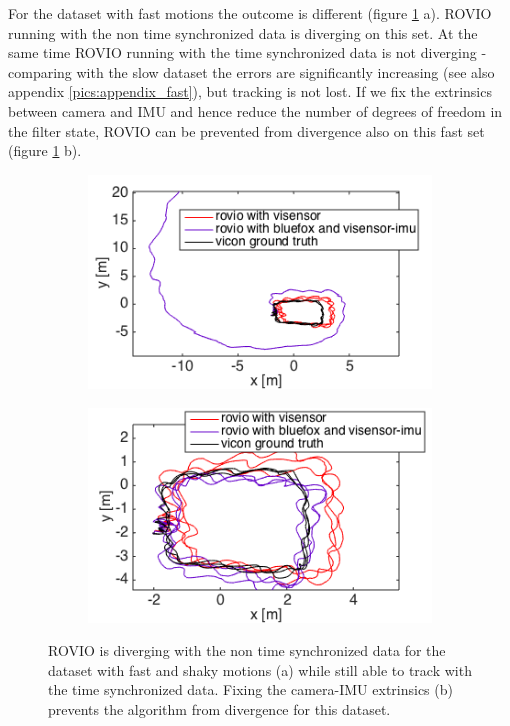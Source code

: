 For the dataset with fast motions the outcome is different (figure \ref{pics:timesync_fast} a). ROVIO running with the non time synchronized data is diverging on this set. At the same time ROVIO running with the time synchronized data is not diverging - comparing with the slow dataset the errors are significantly increasing (see also appendix \ref{pics:appendix_fast}), but tracking is not lost. If we fix the extrinsics between camera and IMU and hence reduce the number of degrees of freedom in the filter state, ROVIO can be prevented from divergence also on this fast set (figure \ref{pics:timesync_fast} b). \\

\begin{figure}
  \begin{subfigure}[b]{0.45\textwidth}
    \includegraphics[width=\textwidth]{images/fast_2D.png}
    \caption{}
  \end{subfigure}
  \hfill
  \begin{subfigure}[b]{0.45\textwidth}
    \includegraphics[width=\textwidth]{images/fast_fixed_2D.png}
    \caption{}
  \end{subfigure}
   \caption{ROVIO is diverging with the non time synchronized data for the dataset with fast and shaky motions (a) while still able to track with the time synchronized data. Fixing the camera-IMU extrinsics (b) prevents the algorithm from divergence for this dataset.}
   \label{pics:timesync_fast}
\end{figure}

